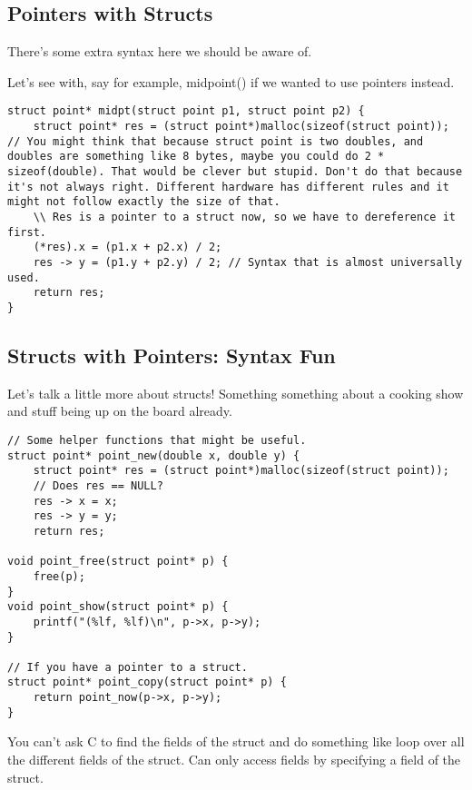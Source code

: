 \documentclass[12pt]{article}
\theoremstyle{definition}
\begin{document}
\subsection{Pointers with Structs}
There's some extra syntax here we should be aware of. 

Let's see with, say for example, midpoint() if we wanted to use pointers instead.
\begin{lstlisting}
struct point* midpt(struct point p1, struct point p2) {
    struct point* res = (struct point*)malloc(sizeof(struct point)); // You might think that because struct point is two doubles, and doubles are something like 8 bytes, maybe you could do 2 * sizeof(double). That would be clever but stupid. Don't do that because it's not always right. Different hardware has different rules and it might not follow exactly the size of that. 
    \\ Res is a pointer to a struct now, so we have to dereference it first. 
    (*res).x = (p1.x + p2.x) / 2;
    res -> y = (p1.y + p2.y) / 2; // Syntax that is almost universally used. 
    return res;
}
\end{lstlisting}
\subsection{Structs with Pointers: Syntax Fun}
Let's talk a little more about structs! Something something about a cooking show and stuff being up on the board already. 

\begin{lstlisting}
// Some helper functions that might be useful. 
struct point* point_new(double x, double y) {
    struct point* res = (struct point*)malloc(sizeof(struct point));
    // Does res == NULL?
    res -> x = x;
    res -> y = y;
    return res;

void point_free(struct point* p) {
    free(p);
}
void point_show(struct point* p) {
    printf("(%lf, %lf)\n", p->x, p->y);
}

// If you have a pointer to a struct.
struct point* point_copy(struct point* p) {
    return point_now(p->x, p->y);
}

\end{lstlisting}
You can't ask C to find the fields of the struct and do something like loop over all the different fields of the struct. Can only access fields by specifying a field of the struct. 
\end{document}
